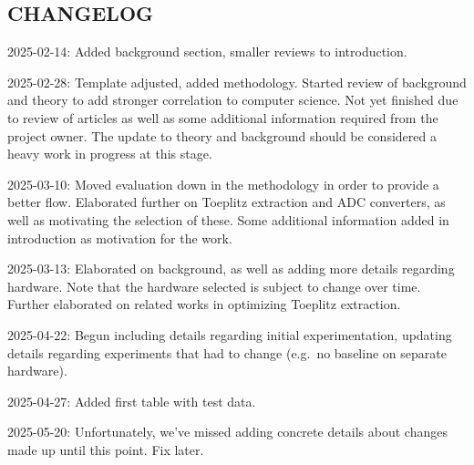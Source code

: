 \documentclass{sigchi}
\begin{document}
\subsection{CHANGELOG}\label{changelog}

2025-02-14: Added background section, smaller reviews to introduction.

2025-02-28: Template adjusted, added methodology. Started review of background and theory to add stronger correlation to computer science. Not yet finished due to review of articles as well as some additional information required from the project owner. The update to theory and background should be considered a heavy work in progress at this stage.

2025-03-10: Moved evaluation down in the methodology in order to provide a better flow. Elaborated further on Toeplitz extraction and ADC converters, as well as motivating the selection of these. Some additional information added in introduction as motivation for the work.

2025-03-13: Elaborated on background, as well as adding more details regarding hardware. Note that the hardware selected is subject to change over time. Further elaborated on related works in optimizing Toeplitz extraction.

2025-04-22: Begun including details regarding initial experimentation, updating details regarding experiments that had to change (e.g.~no baseline on separate hardware).

2025-04-27: Added first table with test data.

2025-05-20: Unfortunately, we've missed adding concrete details about changes made up until this point. Fix later.
\balance{}



\end{document}
